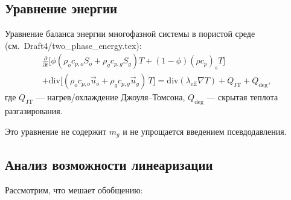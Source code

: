 ﻿\documentclass[12pt,a4paper]{article}
\begin{document}
\subsection{Уравнение энергии}\label{ssec:energy}

Уравнение баланса энергии многофазной системы в пористой среде
(см.\ Draft4/two\_phase\_energy.tex):
\begin{multline}\label{eq:energy}
  \frac{\partial}{\partial t}\bigl[
  \phi(\rho_o c_{p,o} S_o + \rho_g c_{p,g} S_g)T
  + (1-\phi)(\rho c_p)_s T\bigr] \\
  + \mathrm{div}\bigl[(\rho_o c_{p,o}\vec{u}_o
  + \rho_g c_{p,g}\vec{u}_g)\,T\bigr]
  = \mathrm{div}(\lambda_{\mathrm{eff}}\nabla T)
  + Q_{\mathrm{JT}} + Q_{\mathrm{deg}},
\end{multline}
где $Q_{\mathrm{JT}}$ --- нагрев/охлаждение Джоуля--Томсона,
$Q_{\mathrm{deg}}$ --- скрытая теплота разгазирования.

Это уравнение не содержит $m_g$ и не упрощается введением
псевдодавления.

\subsection{Анализ возможности линеаризации}\label{ssec:analysis}

Рассмотрим, что мешает обобщению:
\end{document}
